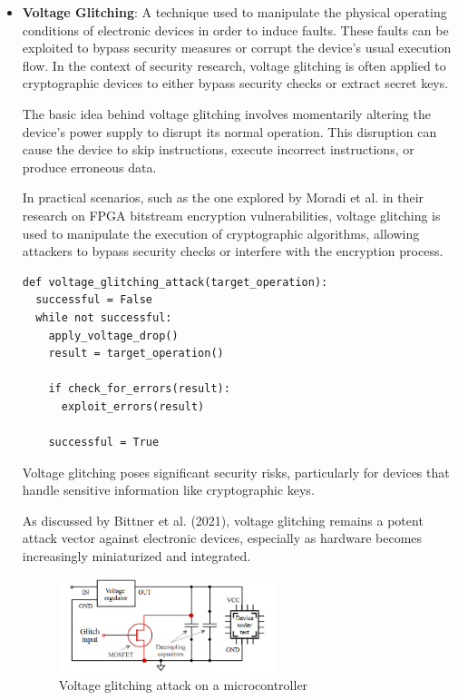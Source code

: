\begin{itemize}
\item \textbf{Voltage Glitching}: A technique used to manipulate the physical operating conditions of electronic devices in order to induce faults. These faults can be exploited to bypass security measures or corrupt the device's usual execution flow. In the context of security research, voltage glitching is often applied to cryptographic devices to either bypass security checks or extract secret keys.

The basic idea behind voltage glitching involves momentarily altering the device's power supply to disrupt its normal operation. This disruption can cause the device to skip instructions, execute incorrect instructions, or produce erroneous data.\cite{bar-elSorcererApprenticeGuide2004}

In practical scenarios, such as the one explored by Moradi et al.\cite{moradiVulnerabilityFPGABitstream2011} in their research on FPGA bitstream encryption vulnerabilities, voltage glitching is used to manipulate the execution of cryptographic algorithms, allowing attackers to bypass security checks or interfere with the encryption process.\\

\begin{verbatim}
def voltage_glitching_attack(target_operation):
  successful = False
  while not successful:
    apply_voltage_drop()
    result = target_operation()
    
    if check_for_errors(result):
      exploit_errors(result)

    successful = True
\end{verbatim}

Voltage glitching poses significant security risks, particularly for devices that handle sensitive information like cryptographic keys.

As discussed by Bittner et al. (2021)\cite{bittnerForgottenThreatVoltage2021}, voltage glitching remains a potent attack vector against electronic devices, especially as hardware becomes increasingly miniaturized and integrated.

\begin{figure}[H]
  \centering
  \includegraphics[width=0.6\textwidth]{images/glitch.png}
  \caption{Voltage glitching attack on a microcontroller\cite{bittnerForgottenThreatVoltage2021}}
  \label{fig:voltage_glitching}
\end{figure}


\end{itemize}
